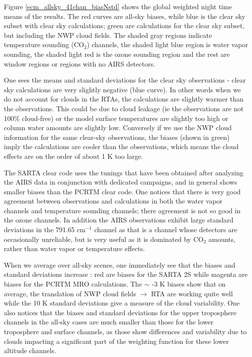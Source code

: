 \documentclass[agupp]{aguplus}              %
\newcommand{\wn}{cm$^{-1}$\xspace}
\newcommand{\cd}{CO$_2$\xspace}
\begin{document}
\begin{article}
Figure \ref{ecm_allsky_41chan_biasNstd} shows the global weighted
night time means of the results. The red curves are all-sky biases, while blue
is the clear sky subset with clear sky calculations; green are
calculations for the clear sky subset, but including the NWP cloud
fields. The shaded gray regions indicate temperature sounding (\cd)
channels, the shaded light blue region is water vapor sounding, the
shaded light red is the ozone sounding region and the rest are window
regions or regions with no AIRS detectors. 

One sees the means and standard deviations for the clear sky
observations - clear sky calculations are very slightly negative (blue
curve). In other words when we do not account for clouds in the RTAs,
the calculations are slightly warmer than the observations. This could
be due to cloud leakage (ie the observations are not 100\% cloud-free)
or the model surface temperatures are slightly too high or column
water amounts are slightly low.  Conversely if we use the NWP cloud
information for the same clear-sky observations, the biases (shown in
green) imply the calculations are cooler than the observations, which
means the cloud effects are on the order of about 1 K too large.

The SARTA clear code uses the tunings that have been obtained after
analyzing the AIRS data in conjunction with dedicated campaigns, and
in general shows smaller biases than the PCRTM clear code. One notices
that there is very good agreement between observations and
calculations in both the water vapor channels and temperature sounding
channels; there agreement is not so good in the ozone channels. In
addition the AIRS observations exhibit large standard deviations in
the 791.65 \wn channel as that is a channel whose detectors are
occasionally unreliable, but is very useful as it is dominated by \cd
amounts, rather than water vapor or temperature effects.

When we average over all-sky scenes, one immediately see that the
biases and standard deviations increase : red are biases for the SARTA
2S while magenta are biases for the PCRTM MRO calculations. The $\sim$
-3 K biases show that on average, the translation of NWP cloud fields
$\rightarrow$ RTA are working quite well while the 10 K standard
deviations give a measure of the cloud variability. One also notices
that the biases and standard deviations for the upper troposphere
channels in the all-sky cases are much smaller than those for the
lower troposphere and surface channels, as those show differences
and variability due to clouds impacting a significant part of the
weighting function for these lower altitude channels.


\end{article}
\end{document}
